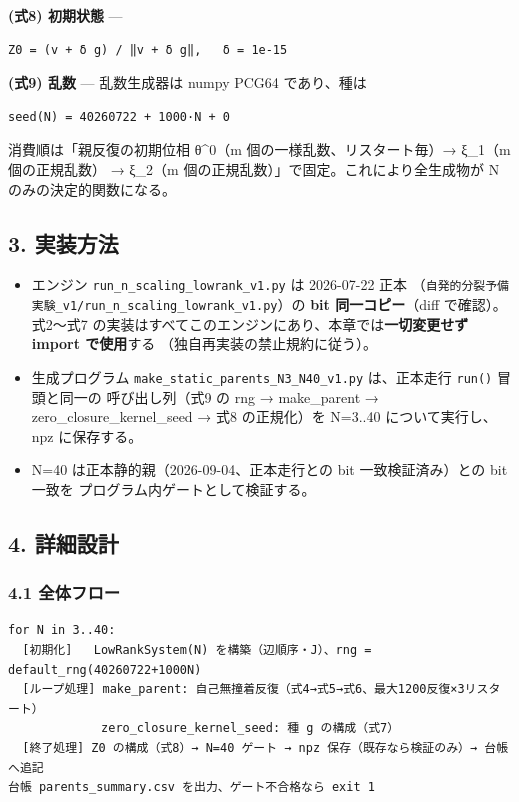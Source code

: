 \documentclass[
  a4paper,
]{ltjsarticle}
\providecommand{\tightlist}{%
  \setlength{\itemsep}{0pt}\setlength{\parskip}{0pt}}
\begin{document}
\textbf{(式8) 初期状態} ---

\begin{verbatim}
Z0 = (v + δ g) / ‖v + δ g‖,   δ = 1e-15
\end{verbatim}

\textbf{(式9) 乱数} --- 乱数生成器は numpy PCG64 であり、種は

\begin{verbatim}
seed(N) = 40260722 + 1000·N + 0
\end{verbatim}

消費順は「親反復の初期位相 θ\^{}0（m 個の一様乱数、リスタート毎）→
ξ\_1（m 個の正規乱数） → ξ\_2（m
個の正規乱数）」で固定。これにより全生成物が N のみの決定的関数になる。

\subsection{3. 実装方法}\label{ux5b9fux88c5ux65b9ux6cd5}

\begin{itemize}
\tightlist
\item
  エンジン \texttt{run\_n\_scaling\_lowrank\_v1.py} は 2026-07-22 正本
  （\texttt{自発的分裂予備実験\_v1/run\_n\_scaling\_lowrank\_v1.py}）の
  \textbf{bit 同一コピー}（diff で確認）。 式2〜式7
  の実装はすべてこのエンジンにあり、本章では\textbf{一切変更せず import
  で使用}する （独自再実装の禁止規約に従う）。
\item
  生成プログラム \texttt{make\_static\_parents\_N3\_N40\_v1.py}
  は、正本走行 \texttt{run()} 冒頭と同一の 呼び出し列（式9 の rng →
  make\_parent → zero\_closure\_kernel\_seed → 式8 の正規化）を N=3..40
  について実行し、npz に保存する。
\item
  N=40 は正本静的親（2026-09-04、正本走行との bit 一致検証済み）との bit
  一致を プログラム内ゲートとして検証する。
\end{itemize}

\subsection{4. 詳細設計}\label{ux8a73ux7d30ux8a2dux8a08}

\subsubsection{4.1 全体フロー}\label{ux5168ux4f53ux30d5ux30edux30fc}

\begin{verbatim}
for N in 3..40:
  [初期化]   LowRankSystem(N) を構築（辺順序・J）、rng = default_rng(40260722+1000N)
  [ループ処理] make_parent: 自己無撞着反復（式4→式5→式6、最大1200反復×3リスタート）
             zero_closure_kernel_seed: 種 g の構成（式7）
  [終了処理] Z0 の構成（式8）→ N=40 ゲート → npz 保存（既存なら検証のみ）→ 台帳へ追記
台帳 parents_summary.csv を出力、ゲート不合格なら exit 1
\end{verbatim}
\end{document}
